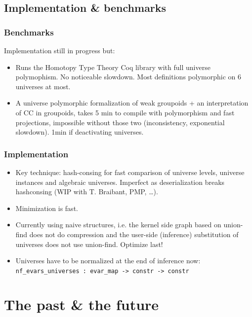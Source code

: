 \subsection{Implementation \& benchmarks}
\begin{frame}
  \frametitle{Benchmarks}

  Implementation still in progress but:
  \begin{itemize}
  \item Runs the Homotopy Type Theory Coq library with full universe
    polymophism. No noticeable slowdown. Most definitions
    polymorphic on 6 universes at most.
  \item A universe polymorphic formalization of weak groupoids + an
    interpretation of CC in groupoids, takes 5 min to compile with
    polymorphism and fast projections, impossible without those two
    (inconsistency, exponential slowdown). 1min if deactivating
    universes.
  \end{itemize}
  
\end{frame}

\begin{frame}[fragile]
  \frametitle{Implementation}

  \begin{itemize}
  \item Key technique: hash-consing for fast comparison of universe
    levels, universe instances and algebraic universes. Imperfect as
    deserialization breaks hashconsing (WIP with T. Braibant, PMP, \ldots).

  \item Minimization is fast.
  \item Currently using naive structures, i.e. the kernel side graph
    based on union-find does not do compression and the user-side
    (inference) substitution of universes does not use union-find.
    Optimize last!

  \item Universes have to be normalized at the end of inference now:
    \verb|nf_evars_universes : evar_map -> constr -> constr|

  \end{itemize}
\end{frame}

\section{The past \& the future}

